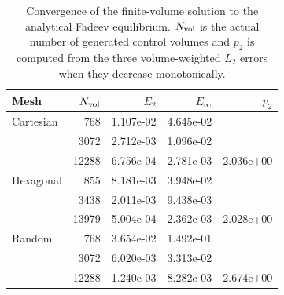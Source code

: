 \begin{table}[t]
\centering
\caption{Convergence of the finite-volume solution to the analytical Fadeev equilibrium. $N_{\rm vol}$ is the actual number of generated control volumes and $p_2$ is computed from the three volume-weighted $L_2$ errors when they decrease monotonically.}
\label{tab:fadeev_convergence}
\begin{tabular}{lrrrr}
\toprule
Mesh & $N_{\rm vol}$ & $E_2$ & $E_\infty$ & $p_2$ \\
\midrule
Cartesian & 768 & 1.107e-02 & 4.645e-02 &  \\
 & 3072 & 2.712e-03 & 1.096e-02 &  \\
 & 12288 & 6.756e-04 & 2.781e-03 & 2.036e+00 \\
\midrule
Hexagonal & 855 & 8.181e-03 & 3.948e-02 &  \\
 & 3438 & 2.011e-03 & 9.438e-03 &  \\
 & 13979 & 5.004e-04 & 2.362e-03 & 2.028e+00 \\
\midrule
Random & 768 & 3.654e-02 & 1.492e-01 &  \\
 & 3072 & 6.020e-03 & 3.313e-02 &  \\
 & 12288 & 1.240e-03 & 8.282e-03 & 2.674e+00 \\
\bottomrule
\end{tabular}
\end{table}
